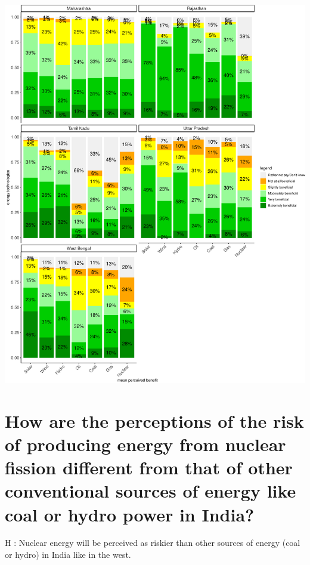 \documentclass[
]{article}
\begin{document}
\includegraphics[width=1\linewidth,height=1\textheight]{Significant_results_files/figure-latex/unnamed-chunk-9-1}

\newpage

\hypertarget{how-are-the-perceptions-of-the-risk-of-producing-energy-from-nuclear-fission-different-from-that-of-other-conventional-sources-of-energy-like-coal-or-hydro-power-in-india}{%
\section{How are the perceptions of the risk of producing energy from
nuclear fission different from that of other conventional sources of
energy like coal or hydro power in
India?}\label{how-are-the-perceptions-of-the-risk-of-producing-energy-from-nuclear-fission-different-from-that-of-other-conventional-sources-of-energy-like-coal-or-hydro-power-in-india}}

H : Nuclear energy will be perceived as riskier than other sources of
energy (coal or hydro) in India like in the west.
\end{document}
